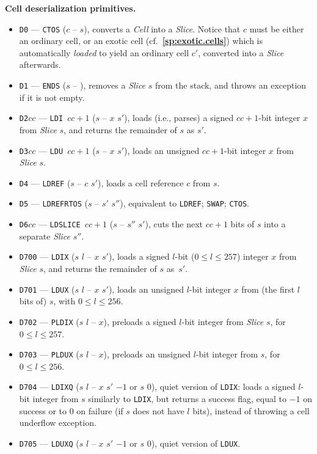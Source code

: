 \documentclass[12pt,oneside]{article}
\def\makepoint#1{\medbreak\noindent{\bf #1.\ }}
\def\nxsubpoint{\refstepcounter{subsubsection}%
  \smallbreak\makepoint{\thesubsubsection}}
\def\refpoint#1{{\rm\textbf{\ref{#1}}}}
\let\ptref=\refpoint
\def\emb#1{\textbf{#1.}}
\begin{document}
\nxsubpoint\emb{Cell deserialization primitives}\label{sp:prim.deser}
\begin{itemize}
\item {\tt D0} --- {\tt CTOS} ($c$ -- $s$), converts a {\em Cell\/} into a {\em Slice}. Notice that $c$ must be either an ordinary cell, or an exotic cell (cf.~\ptref{sp:exotic.cells}) which is automatically {\em loaded\/} to yield an ordinary cell $c'$, converted into a {\em Slice} afterwards.
\item {\tt D1} --- {\tt ENDS} ($s$ -- ), removes a {\em Slice\/} $s$ from the stack, and throws an exception if it is not empty.
\item {\tt D2$cc$} --- {\tt LDI $cc+1$} ($s$ -- $x$ $s'$), loads (i.e., parses) a signed $cc+1$-bit integer $x$ from {\em Slice\/} $s$, and returns the remainder of $s$ as $s'$.
\item {\tt D3$cc$} --- {\tt LDU $cc+1$} ($s$ -- $x$ $s'$), loads an unsigned $cc+1$-bit integer $x$ from {\em Slice\/} $s$.
\item {\tt D4} --- {\tt LDREF} ($s$ -- $c$ $s'$), loads a cell reference $c$ from $s$.
\item {\tt D5} --- {\tt LDREFRTOS} ($s$ -- $s'$ $s''$), equivalent to {\tt LDREF}; {\tt SWAP}; {\tt CTOS}.
\item {\tt D6$cc$} --- {\tt LDSLICE $cc+1$} ($s$ -- $s''$ $s'$), cuts the next $cc+1$ bits of $s$ into a separate {\em Slice\/} $s''$.
\item {\tt D700} --- {\tt LDIX} ($s$ $l$ -- $x$ $s'$), loads a signed $l$-bit ($0\leq l\leq 257$) integer $x$ from {\em Slice\/} $s$, and returns the remainder of $s$ as~$s'$.
\item {\tt D701} --- {\tt LDUX} ($s$ $l$ -- $x$ $s'$), loads an unsigned $l$-bit integer $x$ from (the first $l$ bits of) $s$, with $0\leq l\leq 256$.
\item {\tt D702} --- {\tt PLDIX} ($s$ $l$ -- $x$), preloads a signed $l$-bit integer from {\em Slice\/} $s$, for $0\leq l\leq 257$.
\item {\tt D703} --- {\tt PLDUX} ($s$ $l$ -- $x$), preloads an unsigned $l$-bit integer from $s$, for $0\leq l\leq 256$.
\item {\tt D704} --- {\tt LDIXQ} ($s$ $l$ -- $x$ $s'$ $-1$ or $s$ $0$), quiet version of {\tt LDIX}: loads a signed $l$-bit integer from $s$ similarly to {\tt LDIX}, but returns a success flag, equal to $-1$ on success or to $0$ on failure (if $s$ does not have $l$ bits), instead of throwing a cell underflow exception.
\item {\tt D705} --- {\tt LDUXQ} ($s$ $l$ -- $x$ $s'$ $-1$ or $s$ $0$), quiet version of {\tt LDUX}.

\end{itemize}
\end{document}
